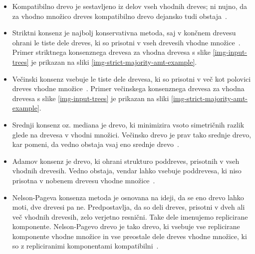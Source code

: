 \documentclass[a4paper, 12pt]{book}
\begin{document}
\begin{itemize}
	\item Kompatibilno drevo je sestavljeno iz delov vseh vhodnih dreves; ni 
		  nujno, da za vhodno množico dreves kompatibilno drevo dejansko tudi 
		  obstaja~\cite{pw}.
	
	\item Striktni konsenz je najbolj konservativna metoda, saj v končnem 
		  drevesu ohrani le tiste dele dreves, ki so prisotni v vseh drevesih 
		  vhodne množice~\cite{bw}. Primer striktnega konsenznega drevesa za 
		  vhodna drevesa s slike \ref{img-input-trees} je prikazan na sliki 
		  \ref{img-strict-majority-amt-example}.
	
	\item Večinski konsenz vsebuje le tiste dele drevesa, ki so prisotni v več
		  kot polovici dreves vhodne množice~\cite{bw}. Primer večinskega 
		  konsenznega drevesa za vhodna drevesa s slike \ref{img-input-trees} 
		  je prikazan na sliki \ref{img-strict-majority-amt-example}.
	
	\item Srednji konsenz oz. mediana je drevo, ki minimizira vsoto simetričnih 
	      razlik glede na drevesa v vhodni množici. Večinsko drevo je prav tako 
	      srednje drevo, kar pomeni, da vedno obstaja vsaj eno srednje drevo~\cite{pw}.
	
	\item Adamov konsenz je drevo, ki ohrani strukturo poddreves, prisotnih v vseh 
	      vhodnih drevesih. Vedno obstaja, vendar lahko vsebuje poddrevesa, ki niso 
	      prisotna v nobenem drevesu vhodne množice~\cite{classification}.
	      
	\item Nelson-Pageva konsenza metoda je osnovana na ideji, da se eno drevo 
		  lahko moti, dve drevesi pa ne. Predpostavlja, da so deli dreves, prisotni
		  v dveh ali več vhodnih drevesih, zelo verjetno resnični. Take dele imenujemo 
		  replicirane komponente. Nelson-Pagevo drevo je tako drevo, ki vsebuje vse 
		  replicirane komponente vhodne množice in vse preostale dele dreves vhodne
		  množice, ki so z repliciranimi komponentami kompatibilni~\cite{classification}.  
\end{itemize}
\end{document}
